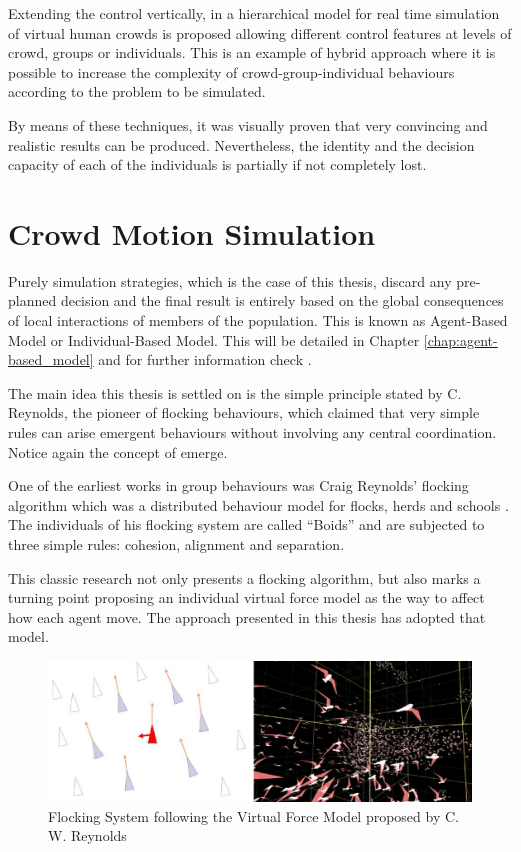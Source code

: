 Extending the control vertically, in \citep{musse2} a hierarchical model for real time simulation of virtual human crowds is proposed allowing different control features at levels of crowd, groups or individuals. This is an example of hybrid approach where it is possible to increase the complexity of crowd-group-individual behaviours according to the problem to be simulated.

By means of these techniques, it was visually proven that very convincing and realistic results can be produced. Nevertheless, the identity and the decision capacity of each of the individuals is partially if not completely lost.

\section{Crowd Motion Simulation}

Purely simulation strategies, which is the case of this thesis, discard any pre-planned decision and the final result is entirely based on the global consequences of local interactions of members of the population. This is known as Agent-Based Model or Individual-Based Model. This will be detailed in Chapter \ref{chap:agent-based_model} and for further information check  \citep{red3D}.

The main idea this thesis is settled on is the simple principle stated by C. Reynolds, the pioneer of flocking behaviours, which claimed that very simple rules can arise emergent behaviours without involving any central coordination. Notice again the concept of emerge.

One of the earliest works  in group behaviours was Craig Reynolds' flocking algorithm which was a distributed behaviour model for flocks, herds and schools \citep{reynolds}. The individuals of his flocking system are called ``Boids'' and are subjected to three simple rules: cohesion, alignment and separation.

This classic research not only presents a flocking algorithm, but also marks a turning point proposing an individual virtual force model as the way to affect how each agent move. The approach presented in this thesis has adopted that model.

\begin{figure}[!htb]
  \centering
  \includegraphics[scale=0.65]{reynolds_flocking.eps}
  \caption{Flocking System following the Virtual Force Model proposed by C. W. Reynolds \citep{reynolds}}
  \label{fig:massive}
\end{figure}

